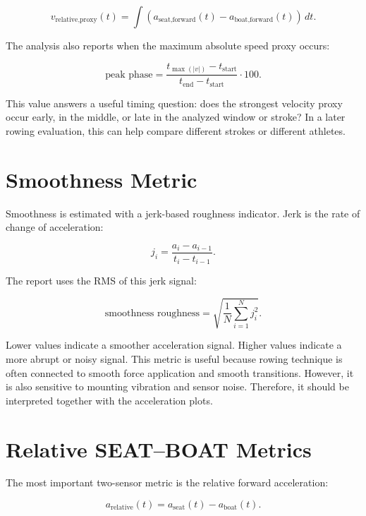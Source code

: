\begin{equation}
  v_{\text{relative,proxy}}(t)
  = \int (a_{\text{seat,forward}}(t)
  - a_{\text{boat,forward}}(t))\,dt.
\end{equation}

The analysis also reports when the maximum absolute speed proxy occurs:

\begin{equation}
  \text{peak phase} =
  \frac{t_{\max(|v|)} - t_{\text{start}}}
  {t_{\text{end}} - t_{\text{start}}} \cdot 100.
\end{equation}

This value answers a useful timing question: does the strongest velocity proxy occur early, in the middle, or late in the analyzed window or stroke? In a later rowing evaluation, this can help compare different strokes or different athletes.

\section{Smoothness Metric}

Smoothness is estimated with a jerk-based roughness indicator. Jerk is the rate of change of acceleration:

\begin{equation}
  j_i = \frac{a_i - a_{i-1}}{t_i - t_{i-1}}.
\end{equation}

The report uses the RMS of this jerk signal:

\begin{equation}
  \text{smoothness roughness} =
  \sqrt{\frac{1}{N}\sum_{i=1}^{N}j_i^2}.
\end{equation}

Lower values indicate a smoother acceleration signal. Higher values indicate a more abrupt or noisy signal. This metric is useful because rowing technique is often connected to smooth force application and smooth transitions. However, it is also sensitive to mounting vibration and sensor noise. Therefore, it should be interpreted together with the acceleration plots.

\section{Relative SEAT--BOAT Metrics}

The most important two-sensor metric is the relative forward acceleration:

\begin{equation}
  a_{\text{relative}}(t)
  = a_{\text{seat}}(t) - a_{\text{boat}}(t).
\end{equation}

